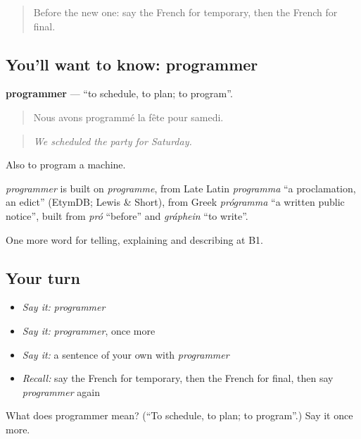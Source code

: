 \label{lesson:FR-C371-programmer}



\begin{quote}
Before the new one: say the French for temporary, then the French for final.
\end{quote}

\subsection*{You'll want to know: programmer}
\textbf{programmer} — \textquotedblleft{}to schedule, to plan; to program\textquotedblright{}.

\begin{quote}
Nous avons programmé la fête pour samedi.
\end{quote}

\begin{quote}
\emph{We scheduled the party for Saturday.}
\end{quote}

Also to program a machine.

\begin{cousinweb}
\emph{programmer} is built on \emph{programme}, from Late Latin \emph{programma} \textquotedblleft{}a proclamation, an edict\textquotedblright{} (EtymDB; Lewis \& Short), from Greek \emph{prógramma} \textquotedblleft{}a written public notice\textquotedblright{}, built from \emph{pró} \textquotedblleft{}before\textquotedblright{} and \emph{gráphein} \textquotedblleft{}to write\textquotedblright{}.
\end{cousinweb}

\begin{grammarlens}[title={What you've built}]
One more word for telling, explaining and describing at B1.
\end{grammarlens}

\subsection*{Your turn}
\begin{itemize}
\raggedright
  \item \emph{Say it:} \emph{programmer}
  \item \emph{Say it:} \emph{programmer}, once more
  \item \emph{Say it:} a sentence of your own with \emph{programmer}
  \item \emph{Recall:} say the French for temporary, then the French for final, then say \emph{programmer} again
\end{itemize}

\begin{tcolorbox}[breakable,colback=teal!4,colframe=teal!35!black,title={Before you move on}]
What does programmer mean? (\textquotedblleft{}To schedule, to plan; to program\textquotedblright{}.) Say it once more.
\end{tcolorbox}
